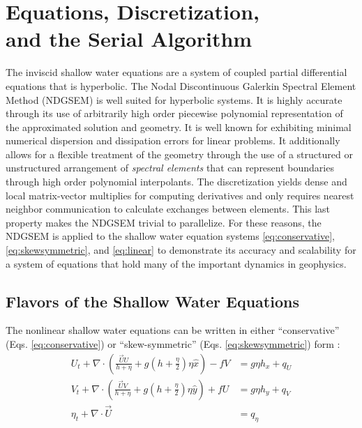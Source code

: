 \documentclass{softwaremanual}
\begin{document}
\chapter{Equations, Discretization, \\ and the Serial Algorithm}
The inviscid shallow water equations are a system of coupled partial differential equations that is hyperbolic. The Nodal Discontinuous Galerkin Spectral Element Method (NDGSEM) is well suited for hyperbolic systems. It is highly accurate through its use of arbitrarily high order piecewise polynomial representation of the approximated solution and geometry. It is well known for exhibiting minimal numerical dispersion and dissipation errors for linear problems. It additionally allows for a flexible treatment of the geometry through the use of a structured or unstructured arrangement of \textit{spectral elements} that can represent boundaries through high order polynomial interpolants. The discretization yields dense and local matrix-vector multiplies for computing derivatives and only requires nearest neighbor communication to calculate exchanges between elements. This last property makes the NDGSEM trivial to parallelize. For these reasons, the NDGSEM is applied to the shallow water equation systems \eqref{eq:conservative}, \eqref{eq:skewsymmetric}, and \eqref{eq:linear} to demonstrate its accuracy and scalability for a system of equations that hold many of the important dynamics in geophysics. 

\section{Flavors of the Shallow Water Equations}
The nonlinear shallow water equations can be written in either ``conservative'' (Eqs. \ref{eq:conservative}) or ``skew-symmetric'' (Eqs. \ref{eq:skewsymmetric}) form :
\begin{subequations}
\begin{align}
U_t  + \nabla \cdot \left( \frac{\vec{U}U}{h + \eta} + g \left(h + \frac{\eta}{2} \right)\eta\hat{x} \right) - fV &= g\eta h_x  + q_U\\
V_t  + \nabla \cdot \left( \frac{\vec{U}V}{h + \eta} + g \left(h + \frac{\eta}{2} \right)\eta\hat{y} \right) + fU &= g\eta h_y + q_V\\
\eta_t + \nabla \cdot \vec{U} &= q_\eta
\end{align}\label{eq:conservative}
\end{subequations}
\end{document}
